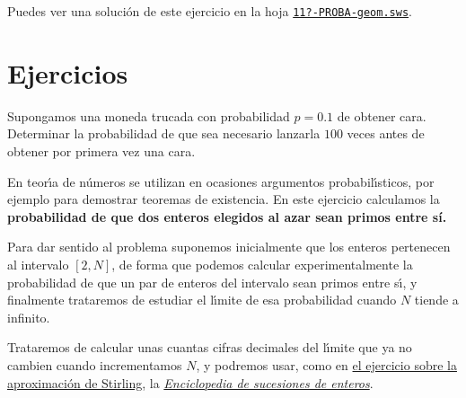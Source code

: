  Puedes ver una soluci\'on de este ejercicio  en la hoja 
 \href{http://sage.mat.uam.es:8888/home/pub/??/}{\tt 11?-PROBA-geom.sws}.
 
 


 
 
 \section{Ejercicios}
 

\begin{ejer}
 
Supongamos una moneda trucada con probabilidad $p=0{.}1$ de obtener cara. Determinar 
la probabilidad de que sea necesario lanzarla $100$ veces antes de obtener  por 
primera vez una cara. 
\end{ejer}






\begin{ejer}
 
 En teor\'{\i}a de n\'umeros se utilizan en ocasiones argumentos 
probabil\'{\i}sticos, por ejemplo para demostrar teoremas de existencia. En 
este ejercicio calculamos la {\bf probabilidad de que dos enteros elegidos 
al azar sean primos entre s\'{i}.}

Para dar sentido al problema suponemos inicialmente que los enteros pertenecen 
al intervalo $[2,N]$, de forma que podemos calcular experimentalmente la 
probabilidad de que un par de enteros del intervalo sean primos entre s\'{\i}, 
y finalmente trataremos de estudiar el l\'{\i}mite de esa probabilidad cuando 
$N$ tiende a infinito. 

Trataremos de calcular unas cuantas cifras decimales del l\'{\i}mite que ya no 
cambien cuando incrementamos $N$, y podremos usar, como en 
\hyperref[stirling]{el 
ejercicio sobre la aproximaci\'on de Stirling}, 
la \href{https://oeis.org/}{{\itshape  Enciclopedia de sucesiones de enteros}}.
 
 
\end{ejer}


